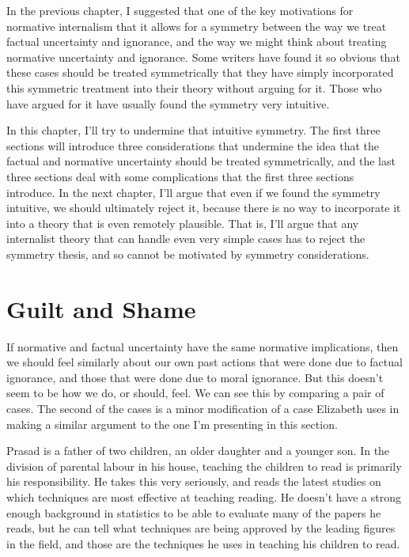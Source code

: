 In the previous chapter, I suggested that one of the key motivations for normative internalism that it allows for a symmetry between the way we treat factual uncertainty and ignorance, and the way we might think about treating normative uncertainty and ignorance. Some writers have found it so obvious that these cases should be treated symmetrically that they have simply incorporated this symmetric treatment into their theory without arguing for it. Those who have argued for it have usually found the symmetry very intuitive.

In this chapter, I'll try to undermine that intuitive symmetry. The first three sections will introduce three considerations that undermine the idea that the factual and normative uncertainty should be treated symmetrically, and the last three sections deal with some complications that the first three sections introduce. In the next chapter, I'll argue that even if we found the symmetry intuitive, we should ultimately reject it, because there is no way to incorporate it into a theory that is even remotely plausible. That is, I'll argue that any internalist theory that can handle even very simple cases has to reject the symmetry thesis, and so cannot be motivated by symmetry considerations.

\section{Guilt and Shame}
\label{guiltandshame}

If normative and factual uncertainty have the same normative implications, then we should feel similarly about our own past actions that were done due to factual ignorance, and those that were done due to moral ignorance. But this doesn't seem to be how we do, or should, feel. We can see this by comparing a pair of cases. The second of the cases is a minor modification of a case Elizabeth \citet{Harman2014} uses in making a similar argument to the one I'm presenting in this section.

\gls{Prasad} is a father of two children, an older daughter and a younger son. In the division of parental labour in his house, teaching the children to read is primarily his responsibility. He takes this very seriously, and reads the latest studies on which techniques are most effective at teaching reading. He doesn't have a strong enough background in statistics to be able to evaluate many of the papers he reads, but he can tell what techniques are being approved by the leading figures in the field, and those are the techniques he uses in teaching his children to read.

